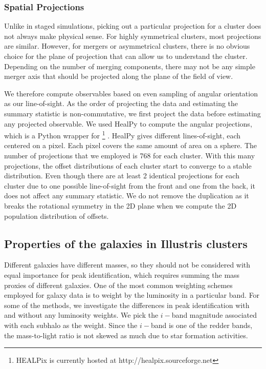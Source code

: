 \subsubsection{Spatial Projections}
\label{subsubsec:projections}
Unlike in staged simulations, picking out a particular projection for a cluster 
does not always make physical sense.
For highly symmetrical clusters, most projections are similar. 
However, for mergers or asymmetrical clusters, 
there is no obvious choice for the plane of projection that can allow us to
understand the cluster. Depending on the number of merging components, there
may not be any simple merger axis that should be 
projected along the plane of the field of view. 

We therefore compute observables based on even sampling of angular orientation 
as our line-of-sight.
As the order of projecting the data and estimating the summary statistic is
non-commutative, we first project the data before estimating any projected 
observable. 
We used {\sc HealPy} to compute the angular projections,
which is a {\sc Python} wrapper for
{} \footnote{HEALPix is
currently hosted at http://healpix.sourceforge.net}
\citep{Gorski2005}. {\sc HealPy} gives different
lines-of-sight, each centered on a {} 
pixel. Each pixel covers the same amount of area on a sphere. 
The number of projections that we employed is 768 for each cluster. With this
many projections, the offset distributions of each cluster start to converge to a
stable distribution. 
Even though there are at least 2 identical projections for each cluster due to
one possible line-of-sight from the front and one from the back, it does not
affect any summary statistic. We do not remove the duplication as it breaks
the rotational symmetry in the 2D plane when we compute the 2D population
distribution of offsets.  


\subsection{Properties of the galaxies in Illustris clusters}
\label{subsec:galaxy_properties}

Different galaxies have different masses, so they should not be considered with equal
importance for peak identification, which requires summing
the mass proxies of different galaxies. One of the most common weighting schemes employed for galaxy data is to weight
by the luminosity in a particular band. For some of the methods, we investigate
the differences in peak identification with and without any luminosity weights.
We pick the $i-$band magnitude
associated with each subhalo as the weight. Since the $i-$band is
one of the redder bands, the mass-to-light ratio is not skewed as much due to star
formation activities. 

